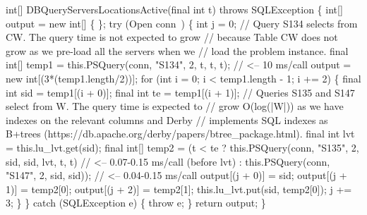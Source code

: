 int[] DBQueryServersLocationsActive(final int t) throws SQLException \{
  int[] output = new int[] \{ \};
  try (\LA{}Open \code{}conn\edoc{}~{\nwtagstyle{}}\RA{}) \{
    int j = 0;
\eatline
{}\nwendcode{}
\nwenddocs{}\plusendmoddef
    // Query S134 selects from CW. The query time is not expected to grow
    // because Table CW does not grow as we pre-load all the servers when we
    // load the problem instance.
    final int[] temp1 = this.PSQuery(conn, "S134", 2, t, t, t);  // <-- 10 ms/call
    output = new int[(3*(temp1.length/2))];
    for (int i = 0; i < temp1.length - 1; i += 2) \{
      final int sid = temp1[(i + 0)];
      final int  te = temp1[(i + 1)];
      // Queries S135 and S147 select from W. The query time is expected to
      // grow O(log(|W|)) as we have indexes on the relevant columns and Derby
      // implements SQL indexes as B+trees (https://db.apache.org/derby/papers/btree_package.html).
      final int lvt = this.lu_lvt.get(sid);
      final int[] temp2 = (t < te
        ? this.PSQuery(conn, "S135", 2, sid, sid, lvt, t, t)  // <-- 0.07-0.15 ms/call (before lvt)
        : this.PSQuery(conn, "S147", 2, sid, sid));           // <-- 0.04-0.15 ms/call
      output[(j + 0)] = sid;
      output[(j + 1)] = temp2[0];
      output[(j + 2)] = temp2[1];
      this.lu_lvt.put(sid, temp2[0]);
      j += 3;
    \}
  \} catch (SQLException e) \{
    throw e;
  \}
  return output;
\}
\nwendcode{}\nwdocspar
